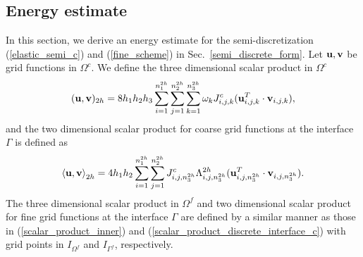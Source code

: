 \subsection{Energy estimate}\label{sec_energy}
In this section, we derive an energy estimate for the semi-discretization (\ref{elastic_semi_c}) and (\ref{fine_scheme}) in Sec.~\ref{semi_discrete_form}. Let ${\bf u}, {\bf v}$ be grid functions in $\Omega^c$. We define the three dimensional scalar product in $\Omega^c$
\begin{equation}\label{scalar_product_inner}
({\bf u}, {\bf v})_{2h} = 8h_1h_2h_3\sum_{i=1}^{n_1^{2h}}\sum_{j=1}^{n_2^{2h}}\sum_{k=1}^{n_3^{2h}}\omega_k{J}_{i,j,k}^{c}({\bf u}_{i,j,k}^T\cdot {\bf v}_{i,j,k}),
\end{equation}
and the two dimensional scalar product for coarse grid functions at the interface $\Gamma$ is defined as 
\begin{equation}\label{scalar_product_discrete_interface_c}
\left<{\bf u}, {\bf v}\right>_{2h} = 4h_1h_2\sum_{i=1}^{n_1^{2h}}\sum_{j=1}^{n_2^{2h}}{  J}_{i,j,n_3^{2h}}^{c}\Lambda^{2h}_{i,j,n_3^{2h}}({\bf u}_{i,j,n_3^{2h}}^T\cdot {\bf v}_{i,j,n_3^{2h}}).
\end{equation}
The three dimensional scalar product in $\Omega^f$ and two dimensional scalar product for fine grid functions at the interface $\Gamma$ are defined by a similar manner as those in (\ref{scalar_product_inner}) and (\ref{scalar_product_discrete_interface_c}) with grid points in $I_{\Omega^f}$ and $I_{\Gamma^f}$, respectively. 
